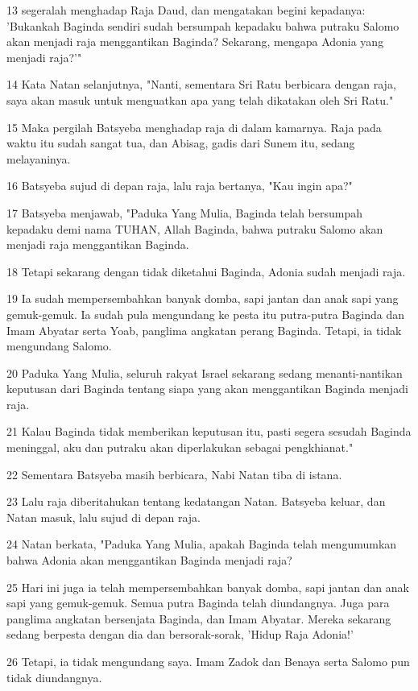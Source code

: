 \par 13 segeralah menghadap Raja Daud, dan mengatakan begini kepadanya: 'Bukankah Baginda sendiri sudah bersumpah kepadaku bahwa putraku Salomo akan menjadi raja menggantikan Baginda? Sekarang, mengapa Adonia yang menjadi raja?'"
\par 14 Kata Natan selanjutnya, "Nanti, sementara Sri Ratu berbicara dengan raja, saya akan masuk untuk menguatkan apa yang telah dikatakan oleh Sri Ratu."
\par 15 Maka pergilah Batsyeba menghadap raja di dalam kamarnya. Raja pada waktu itu sudah sangat tua, dan Abisag, gadis dari Sunem itu, sedang melayaninya.
\par 16 Batsyeba sujud di depan raja, lalu raja bertanya, "Kau ingin apa?"
\par 17 Batsyeba menjawab, "Paduka Yang Mulia, Baginda telah bersumpah kepadaku demi nama TUHAN, Allah Baginda, bahwa putraku Salomo akan menjadi raja menggantikan Baginda.
\par 18 Tetapi sekarang dengan tidak diketahui Baginda, Adonia sudah menjadi raja.
\par 19 Ia sudah mempersembahkan banyak domba, sapi jantan dan anak sapi yang gemuk-gemuk. Ia sudah pula mengundang ke pesta itu putra-putra Baginda dan Imam Abyatar serta Yoab, panglima angkatan perang Baginda. Tetapi, ia tidak mengundang Salomo.
\par 20 Paduka Yang Mulia, seluruh rakyat Israel sekarang sedang menanti-nantikan keputusan dari Baginda tentang siapa yang akan menggantikan Baginda menjadi raja.
\par 21 Kalau Baginda tidak memberikan keputusan itu, pasti segera sesudah Baginda meninggal, aku dan putraku akan diperlakukan sebagai pengkhianat."
\par 22 Sementara Batsyeba masih berbicara, Nabi Natan tiba di istana.
\par 23 Lalu raja diberitahukan tentang kedatangan Natan. Batsyeba keluar, dan Natan masuk, lalu sujud di depan raja.
\par 24 Natan berkata, "Paduka Yang Mulia, apakah Baginda telah mengumumkan bahwa Adonia akan menggantikan Baginda menjadi raja?
\par 25 Hari ini juga ia telah mempersembahkan banyak domba, sapi jantan dan anak sapi yang gemuk-gemuk. Semua putra Baginda telah diundangnya. Juga para panglima angkatan bersenjata Baginda, dan Imam Abyatar. Mereka sekarang sedang berpesta dengan dia dan bersorak-sorak, 'Hidup Raja Adonia!'
\par 26 Tetapi, ia tidak mengundang saya. Imam Zadok dan Benaya serta Salomo pun tidak diundangnya.

